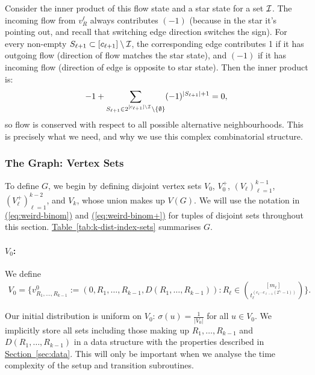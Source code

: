 \documentclass{article}
\newcommand{\eq}[1]{\hyperref[eq:#1]{(\ref*{eq:#1})}}
\renewcommand{\sec}[1]{\hyperref[sec:#1]{Section~\ref*{sec:#1}}}
\newcommand{\tabl}[1]{\hyperref[tab:#1]{Table~\ref*{tab:#1}}}
\renewcommand{\>}{\rangle}
\newcommand{\<}{\langle}
\renewcommand{\(}{\left(}
\renewcommand{\)}{\right)}
\begin{document}
Consider the inner product of this flow state and a star state for a set ${\cal I}$. The incoming flow from $v_R^\ell$ always contributes $(-1)$ (because in the star it's pointing out, and recall that switching edge direction switches the sign). For every non-empty $S_{\ell+1}\subset [c_{\ell+1}]\setminus {\cal I}$, the corresponding edge
contributes 1 if it has outgoing flow (direction of flow matches the star state), and $(-1)$ if it has incoming flow (direction of edge is opposite to star state). 
Then the inner product is:
$$-1 + \sum_{S_{\ell+1}\in 2^{[c_{\ell+1}]\setminus{\cal I}}\setminus\{\emptyset\}}(-1)^{|S_{\ell+1}|+1} = 0,$$
so flow is conserved with respect to all possible alternative neighbourhoods. This is precisely what we need, and why we use this complex combinatorial structure.


\subsubsection{The Graph: Vertex Sets}\label{sec:k-dist-G-vertices}

To define $G$, we begin by defining disjoint vertex sets $V_0$, $V_0^+$, $(V_{\ell})_{\ell=1}^{k-1}$, $(V_{\ell}^+)_{\ell=1}^{k-2}$, and $V_k$, whose union makes up $V(G)$. We will use the notation in \eq{weird-binom} and \eq{weird-binom+} for tuples of disjoint sets throughout this section. \tabl{k-dist-index-sets} summarises $G$.






\paragraph{$V_0$:} We define
\begin{multline}
	V_0=\Bigg\{v^0_{R_1,\dots,R_{k-1}}:=(0,R_1,\dots,R_{k-1},D(R_1,\dots,R_{k-1})): R_{\ell} \in \binom{[m_{\ell}]}{t_{\ell}^{(c_1\cdots c_{\ell-1}(2^{c_{\ell}}-1))}}\Bigg\}.\label{eq:k-dist-V1}
\end{multline}


Our initial distribution is uniform on $V_0$: $\sigma(u)=\frac{1}{|V_0|}$ for all $u\in V_0$. We implicitly store all sets including those making up $R_1,\dots,R_{k-1}$ and $D(R_1,\dots,R_{k-1})$ in a data structure with the properties described in \sec{data}. This will only be important when we analyse the time complexity of the setup and transition subroutines. 
\end{document}
